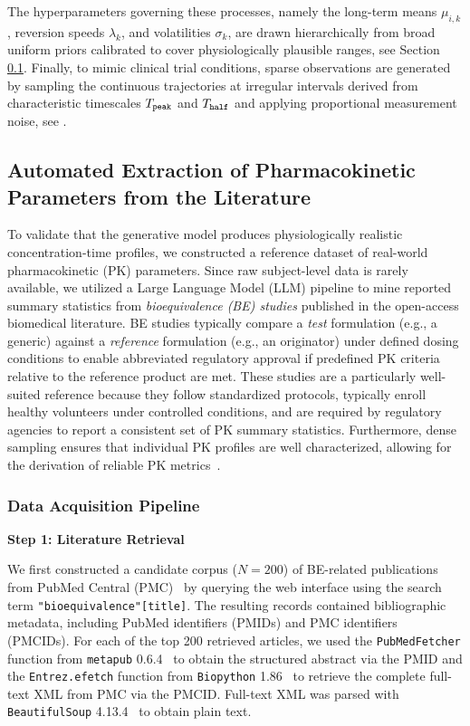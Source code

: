 The hyperparameters governing these processes, namely the long-term means $\mu_{i,k}$, reversion speeds $\lambda_k$, and volatilities $\sigma_k$, are drawn hierarchically from broad uniform priors calibrated to cover physiologically plausible ranges, see Section \ref{app:literature-extraction}. Finally, to mimic clinical trial conditions, sparse observations are generated by sampling the continuous trajectories at irregular intervals derived from characteristic timescales $T_{\tt peak}$ and $T_{\tt half}$ and applying proportional measurement noise, see \cite{marin2025amortized}.

\subsection{Automated Extraction of Pharmacokinetic Parameters from the Literature}
\label{app:literature-extraction}

To validate that the generative model produces physiologically realistic concentration-time profiles, we constructed a reference dataset of real-world pharmacokinetic (PK) parameters.
%
Since raw subject-level data is rarely available, we utilized a Large Language Model (LLM) pipeline to mine reported summary statistics from \textit{bioequivalence (BE) studies} published in the open-access biomedical literature. 
%
BE studies typically compare a \emph{test} formulation (e.g., a generic) against a \emph{reference} formulation (e.g., an originator) under defined dosing conditions to enable abbreviated regulatory approval if predefined PK criteria relative to the reference product are met. 
%
These studies are a particularly well-suited reference because they follow standardized protocols, typically enroll healthy volunteers under controlled conditions, and are required by regulatory agencies to report a consistent set of PK summary statistics.
%
Furthermore, dense sampling ensures that individual PK profiles are well characterized, allowing for the derivation of reliable PK metrics~\citep{FDA2021Bioequivalence}.

\subsubsection{Data Acquisition Pipeline}

\textbf{Step 1: Literature Retrieval}

We first constructed a candidate corpus ($N=200$) of BE-related publications from PubMed Central (PMC)~\citep{pmc_database} by querying the web interface using the search term \texttt{"bioequivalence"[title]}.  
%
The resulting records contained bibliographic metadata, including PubMed identifiers (PMIDs) and PMC identifiers (PMCIDs).  
%
For each of the top 200 retrieved articles, we used the \texttt{PubMedFetcher} function from \texttt{metapub} 0.6.4~\citep{most_metapub} to obtain the structured abstract via the PMID and the \texttt{Entrez.efetch} function from \texttt{Biopython} 1.86~\citep{biopython} to retrieve the complete full-text XML from PMC via the PMCID.
%
Full-text XML was parsed with \texttt{BeautifulSoup} 4.13.4~\citep{beautifulsoup4_2025} to obtain plain text.


